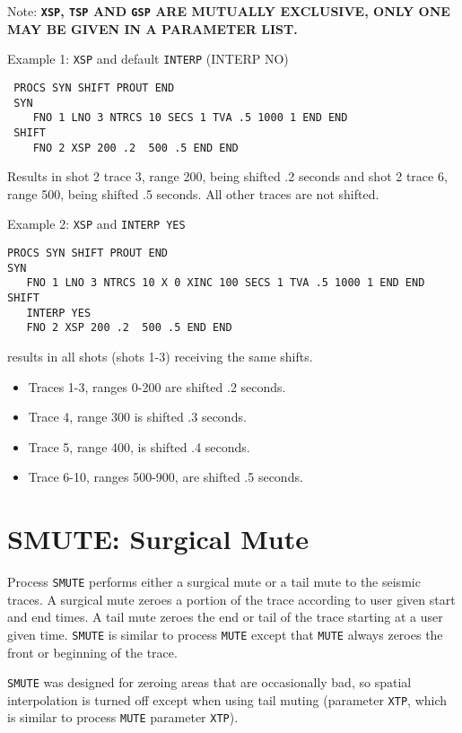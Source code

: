 Note:
\textbf{\texttt{XSP}, \texttt{TSP} AND \texttt{GSP} ARE MUTUALLY EXCLUSIVE, ONLY ONE MAY BE GIVEN IN A
PARAMETER LIST.}

Example 1:  \texttt{XSP} and default \texttt{INTERP}  (INTERP NO)

\begin{verbatim}
 PROCS SYN SHIFT PROUT END
 SYN
    FNO 1 LNO 3 NTRCS 10 SECS 1 TVA .5 1000 1 END END
 SHIFT
    FNO 2 XSP 200 .2  500 .5 END END
\end{verbatim}

Results in \gls{shot} 2 trace 3, range 200, being shifted .2 seconds and
           \gls{shot} 2 trace 6, range 500, being shifted .5 seconds.
All other traces are not shifted.


Example 2:  \texttt{XSP} and \texttt{INTERP YES}

\begin{verbatim}
PROCS SYN SHIFT PROUT END
SYN
   FNO 1 LNO 3 NTRCS 10 X 0 XINC 100 SECS 1 TVA .5 1000 1 END END
SHIFT
   INTERP YES
   FNO 2 XSP 200 .2  500 .5 END END
\end{verbatim}

results in all \glspl{shot} (\glspl{shot} 1-3) receiving the same shifts.
\begin{itemize}
    \item Traces  1-3, ranges 0-200 are shifted .2 seconds.
\item Trace 4, range 300 is shifted .3 seconds.
\item Trace 5, range 400, is shifted .4 seconds.
\item Trace 6-10, ranges 500-900, are shifted .5 seconds.
\end{itemize}

\section{SMUTE: Surgical Mute}
\label{cmd_smute}

Process \texttt{SMUTE} performs either a surgical mute or a tail mute to the
seismic traces.  A surgical mute zeroes a portion of the trace according
to user given start and end times.  A tail mute zeroes the end or tail
of the trace starting at a user given time.  \texttt{SMUTE} is similar to process
\texttt{MUTE} except that \texttt{MUTE} always zeroes the front or beginning of the trace.

\texttt{SMUTE} was designed for zeroing areas that are occasionally bad, so
spatial interpolation is turned off except when using tail muting
(parameter \texttt{XTP}, which is similar to process \texttt{MUTE} parameter \texttt{XTP}).


